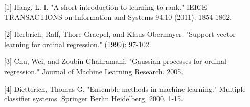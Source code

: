 \small{
[1] Hang, L. I. "A short introduction to learning to rank." IEICE TRANSACTIONS on Information and Systems 94.10 (2011): 1854-1862.

[2] Herbrich, Ralf, Thore Graepel, and Klaus Obermayer. "Support vector learning for ordinal regression." (1999): 97-102.

[3] Chu, Wei, and Zoubin Ghahramani. "Gaussian processes for ordinal regression." Journal of Machine Learning Research. 2005.

[4] Dietterich, Thomas G. "Ensemble methods in machine learning." Multiple classifier systems. Springer Berlin Heidelberg, 2000. 1-15.
}
